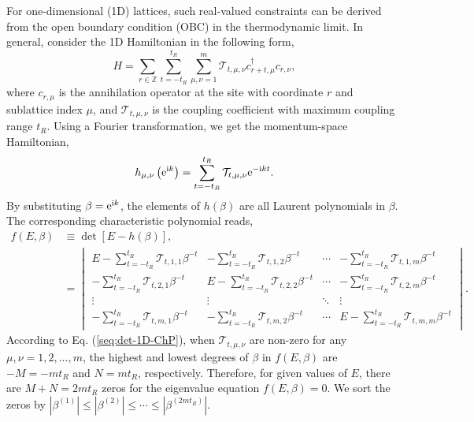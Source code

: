 For one-dimensional (1D) lattices, such real-valued constraints can
be derived from the open boundary condition (OBC) in the thermodynamic
limit. In general, consider the 1D Hamiltonian in the following form,
\begin{equation}
H=\sum_{r\in\mathbb{Z}}\sum_{t=-t_{R}}^{t_{R}}\sum_{\mu,\nu=1}^{m}\mathcal{T}_{t,\mu,\nu}c_{r+t,\mu}^{\dagger}c_{r,\nu},
\end{equation}
where $c_{r,\mu}$ is the annihilation operator at the site with coordinate
$r$ and sublattice index $\mu$, and $\mathcal{T}_{t,\mu,\nu}$ is
the coupling coefficient with maximum coupling range $t_{R}$. Using
a Fourier transformation, we get the momentum-space Hamiltonian, 
\begin{equation}
h_{\mu,\nu}\left(\mathrm{e}^{\mathrm{i} k}\right)=\sum_{t=-t_{R}}^{t_{R}}\mathcal{T}_{t,\mu,\nu}\mathrm{e}^{-\mathrm{i} kt}.
\end{equation}
By substituting $\beta=\mathrm{e}^{\mathrm{i} k}$, the elements of $h(\beta)$
are all Laurent polynomials in $\beta$. The corresponding characteristic
polynomial reads, 
\begin{align}
f\left(E,\beta\right) & \equiv\det\left[E-h\left(\beta\right)\right],\nonumber \\
 & =\begin{vmatrix}E-\sum\limits_{t=-t_{R}}^{t_{R}}\mathcal{T}_{t,1,1}\beta^{-t} & -\sum\limits_{t=-t_{R}}^{t_{R}}\mathcal{T}_{t,1,2}\beta^{-t} & \cdots & -\sum\limits_{t=-t_{R}}^{t_{R}}\mathcal{T}_{t,1,m}\beta^{-t}\\
-\sum\limits_{t=-t_{R}}^{t_{R}}\mathcal{T}_{t,2,1}\beta^{-t} & E-\sum\limits_{t=-t_{R}}^{t_{R}}\mathcal{T}_{t,2,2}\beta^{-t} & \cdots & -\sum\limits_{t=-t_{R}}^{t_{R}}\mathcal{T}_{t,2,m}\beta^{-t}\\
\vdots & \vdots & \ddots & \vdots\\
-\sum\limits_{t=-t_{R}}^{t_{R}}\mathcal{T}_{t,m,1}\beta^{-t} & -\sum\limits_{t=-t_{R}}^{t_{R}}\mathcal{T}_{t,m,2}\beta^{-t} & \cdots & E-\sum\limits_{t=-t_{R}}^{t_{R}}\mathcal{T}_{t,m,m}\beta^{-t}
\end{vmatrix}.\label{seq:det-1D-ChP}
\end{align}
According to Eq. (\ref{seq:det-1D-ChP}), when $\mathcal{T}_{t,\mu,\nu}$
are non-zero for any $\mu,\nu=1,2,\dots,m$, the highest and lowest
degrees of $\beta$ in $f\left(E,\beta\right)$ are $-M=-mt_{R}$
and $N=mt_{R}$, respectively. Therefore, for given values of $E$,
there are $M+N=2mt_{R}$ zeros for the eigenvalue equation $f\left(E,\beta\right)=0$.
We sort the zeros by $\left|\beta^{(1)}\right|\leq\left|\beta^{(2)}\right|\leq\cdots\leq\left|\beta^{(2mt_{R})}\right|$.
